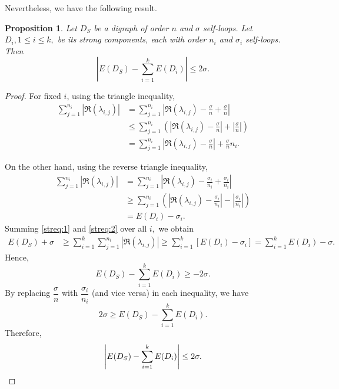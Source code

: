 \documentclass[12pt,a4paper,reqno]{amsart}
\numberwithin{equation}{section}
\theoremstyle{plain}
\newtheorem{proposition}[theorem]{Proposition}
\theoremstyle{definition}
\newcommand{\<}{\langle}
\renewcommand{\>}{\rangle}
\begin{document}
Nevertheless, we have the following result.
	\begin{proposition}
		Let $D_S$ be a digraph of order $n$ and $\sigma$ self-loops. Let $D_i, 1 \leq i \leq k,$ be its strong components, each with order $n_i$ and $\sigma_i$ self-loops. Then
		$$\left|E(D_S)-\sum_{i=1}^k E(D_i) \right| \leq 2\sigma.$$
	\end{proposition}
	
	\begin{proof}
		 For fixed $i$, using the triangle inequality,
		\begin{align}\label{streq:1}
			\sum_{j=1}^{n_i} \left| \Re(\lambda_{i,j})\right|
			&= \sum_{j=1}^{n_i} \left| \Re(\lambda_{i,j})-\frac{\sigma}{n} + \frac{\sigma}{n}  \right| \nonumber\\
			&\leq \sum_{j=1}^{n_i} \left( \left| \Re(\lambda_{i,j})-\frac{\sigma}{n}  \right| + \left| \frac{\sigma}{n}  \right| \right) \nonumber \\
			&= \sum_{j=1}^{n_i} \left| \Re(\lambda_{i,j})-\frac{\sigma}{n}  \right| + \frac{\sigma}{n}n_i.
		\end{align}
		
		On the other hand, using the reverse triangle inequality,
		\begin{align}\label{streq:2}
			\sum_{j=1}^{n_i} \left| \Re(\lambda_{i,j})\right| &= \sum_{j=1}^{n_i} \left| \Re(\lambda_{i,j})-\frac{\sigma_i}{n_i} + \frac{\sigma_i}{n_i}  \right|\nonumber \\
			&\geq \sum_{j=1}^{n_i} \left( \left| \Re(\lambda_{i,j})-\frac{\sigma_i}{n_i}  \right| - \left| \frac{\sigma_i}{n_i} \right| \right) \nonumber\\
			&=E(D_i) - \sigma_i.
		\end{align}
		Summing \eqref{streq:1} and \eqref{streq:2} over all $i,$  we obtain
		\begin{align*}
			E(D_S)+\sigma 
			&\geq \sum_{i=1}^k \sum_{j=1}^{n_i} \left| \Re(\lambda_{i,j})\right|
			\geq \sum_{i=1}^k \left[ E(D_i) - \sigma_i \right] 
			= \sum_{i=1}^k E(D_i) - \sigma.
		\end{align*}
		Hence, 
		\[
		E(D_S) -\sum_{i=1}^k E(D_i) \geq -2\sigma.
		\]
		By replacing $\dfrac{\sigma}{n}$ with $\dfrac{\sigma_i}{n_i}$ (and vice versa) in each inequality, we have 
		\[
		2\sigma \geq E(D_S) -\sum_{i=1}^k E(D_i).
		\]
		Therefore, 
		\[
		\left|E(D_S)-\sum_{i=1}^k E(D_i) \right| \leq 2\sigma. \qedhere
		\]  
	\end{proof}
\end{document}
